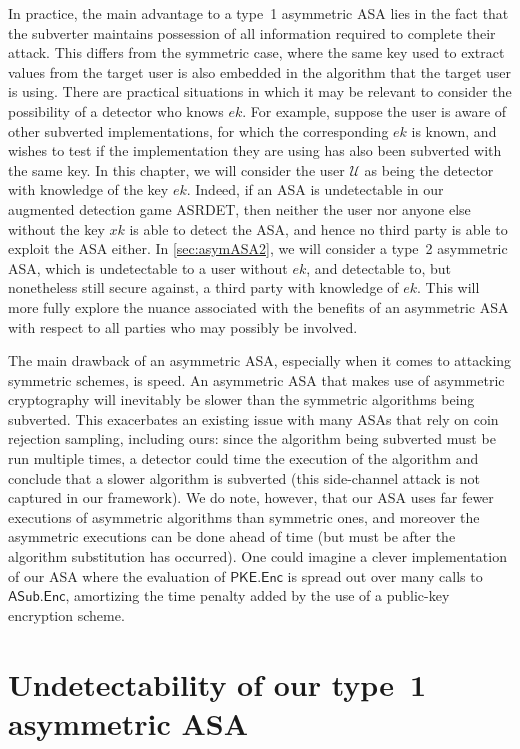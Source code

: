 In practice, the main advantage to a type~1 asymmetric ASA lies in the fact that the subverter maintains possession of all information required to complete their attack. This differs from the symmetric case, where the same key used to extract values from the target user is also embedded in the algorithm that the target user is using. There are practical situations in which it may be relevant to consider the possibility of a detector who knows $ek$. For example, suppose the user is aware of other subverted implementations, for which the corresponding $ek$ is known, and wishes to test if the implementation they are using has also been subverted with the same key. In this chapter, we will consider the user $\mathcal{U}$ as being the detector with knowledge of the key $ek$. Indeed, if an ASA is undetectable in our augmented detection game ASRDET, then neither the user nor anyone else without the key $xk$ is able to detect the ASA, and hence no third party is able to exploit the ASA either. In \autoref{sec:asymASA2}, we will consider a type~2 asymmetric ASA, which is undetectable to a user without $ek$, and detectable to, but nonetheless still secure against, a third party with knowledge of $ek$. This will more fully explore the nuance associated with the benefits of an asymmetric ASA with respect to all parties who may possibly be involved.

The main drawback of an asymmetric ASA, especially when it comes to attacking symmetric schemes, is speed. An asymmetric ASA that makes use of asymmetric cryptography will inevitably be slower than the symmetric algorithms being subverted. This exacerbates an existing issue with many ASAs that rely on coin rejection sampling, including ours: since the algorithm being subverted must be run multiple times, a detector could time the execution of the algorithm and conclude that a slower algorithm is subverted (this side-channel attack is not captured in our framework). We do note, however, that our ASA uses far fewer executions of asymmetric algorithms than symmetric ones, and moreover the asymmetric executions can be done ahead of time (but must be after the algorithm substitution has occurred). One could imagine a clever implementation of our ASA where the evaluation of $\mathsf{PKE.Enc}$ is spread out over many calls to $\mathsf{ASub.Enc}$, amortizing the time penalty added by the use of a public-key encryption scheme.

\section{Undetectability of our type~1 asymmetric ASA}

